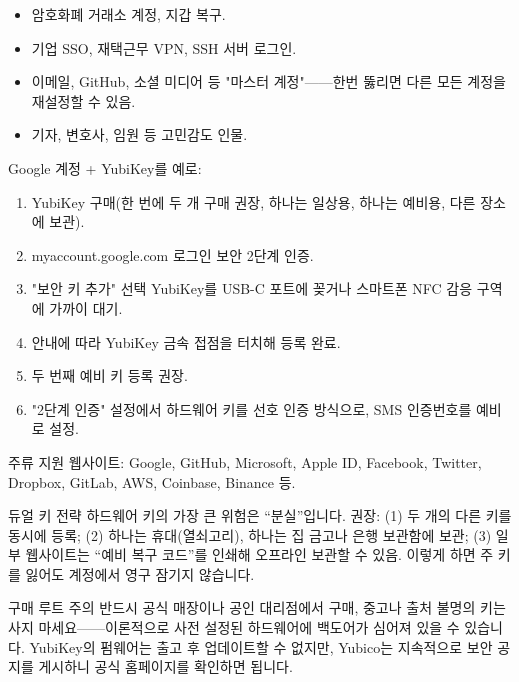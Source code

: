 
\begin{itemize}
  \item 암호화폐 거래소 계정, 지갑 복구.
  \item 기업 SSO, 재택근무 VPN, SSH 서버 로그인.
  \item 이메일, GitHub, 소셜 미디어 등 "마스터 계정"——한번 뚫리면 다른 모든 계정을 재설정할 수 있음.
  \item 기자, 변호사, 임원 등 고민감도 인물.
\end{itemize}


Google 계정 + YubiKey를 예로:

\begin{enumerate}
  \item YubiKey 구매(한 번에 두 개 구매 권장, 하나는 일상용, 하나는 예비용, 다른 장소에 보관).
  \item myaccount.google.com 로그인 보안 2단계 인증.
  \item "보안 키 추가" 선택 YubiKey를 USB-C 포트에 꽂거나 스마트폰 NFC 감응 구역에 가까이 대기.
  \item 안내에 따라 YubiKey 금속 접점을 터치해 등록 완료.
  \item 두 번째 예비 키 등록 권장.
  \item "2단계 인증" 설정에서 하드웨어 키를 선호 인증 방식으로, SMS 인증번호를 예비로 설정.
\end{enumerate}

주류 지원 웹사이트: Google, GitHub, Microsoft, Apple ID, Facebook, Twitter, Dropbox, GitLab, AWS, Coinbase, Binance 등.

\begin{tcbinfo}{듀얼 키 전략}
하드웨어 키의 가장 큰 위험은 “분실”입니다. 권장: (1) 두 개의 다른 키를 동시에 등록; (2) 하나는 휴대(열쇠고리), 하나는 집 금고나 은행 보관함에 보관; (3) 일부 웹사이트는 “예비 복구 코드”를 인쇄해 오프라인 보관할 수 있음. 이렇게 하면 주 키를 잃어도 계정에서 영구 잠기지 않습니다.

\end{tcbinfo}

\begin{tcbwarn}{구매 루트 주의}
반드시 공식 매장이나 공인 대리점에서 구매, 중고나 출처 불명의 키는 사지 마세요——이론적으로 사전 설정된 하드웨어에 백도어가 심어져 있을 수 있습니다. YubiKey의 펌웨어는 출고 후 업데이트할 수 없지만, Yubico는 지속적으로 보안 공지를 게시하니 공식 홈페이지를 확인하면 됩니다.

\end{tcbwarn}

